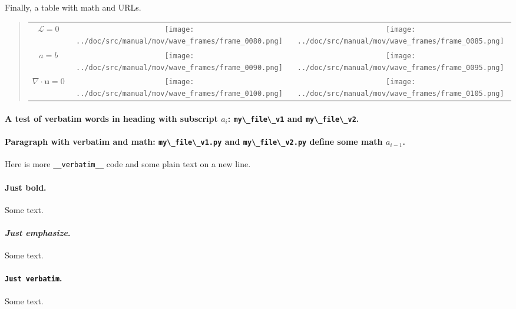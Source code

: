 \documentclass[%
oneside,                 %
final,                   %
10pt]{article}
\theoremstyle{definition}
\begin{document}
\begin{enumerate}
\noindent
Finally, a table with math
and URLs.



\begin{quote}
\begin{tabular}{ccc}
\hline
 \\
\hline
$\mathcal{L}=0$         & \texttt{[image: ../doc/src/manual/mov/wave\_frames/frame\_0080.png]} & \texttt{[image: ../doc/src/manual/mov/wave\_frames/frame\_0085.png]} \\
$a=b$                   & \texttt{[image: ../doc/src/manual/mov/wave\_frames/frame\_0090.png]} & \texttt{[image: ../doc/src/manual/mov/wave\_frames/frame\_0095.png]} \\
$\nabla\cdot\bm{u} =0 $ & \texttt{[image: ../doc/src/manual/mov/wave\_frames/frame\_0100.png]} & \texttt{[image: ../doc/src/manual/mov/wave\_frames/frame\_0105.png]} \\
\hline
\end{tabular}
\end{quote}

\noindent
\paragraph{A test of verbatim words in heading with subscript $a_i$: \protect\Verb!my\_file\_v1! and \protect\Verb!my\_file\_v2!.}
\paragraph{Paragraph with verbatim and math: \protect\Verb!my\_file\_v1.py! and \protect\Verb!my\_file\_v2.py! define some math $a_{i-1}$.}
Here is more \Verb!__verbatim__! code and
some plain text on a new line.

\paragraph{\textbf{Just bold}.}
Some text.

\paragraph{\emph{Just emphasize}.}
Some text.

\paragraph{\texttt{Just verbatim}.}
Some text.


\end{enumerate}
\end{document}

